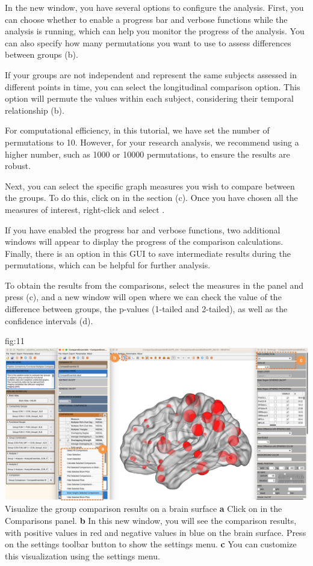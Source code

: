 \documentclass[justified]{tufte-handout}
\begin{document}
In the new window, you have several options to configure the analysis. First, you can choose whether to enable a progress bar and verbose functions while the analysis is running, which can help you monitor the progress of the analysis. You can also specify how many permutations you want to use to assess differences between groups (b).

If your groups are not independent and represent the same subjects assessed in different points in time, you can select the longitudinal comparison option. This option will permute the values within each subject, considering their temporal relationship (b).

For computational efficiency, in this tutorial, we have set the number of permutations to 10. However, for your research analysis, we recommend using a higher number, such as 1000 or 10000 permutations, to ensure the results are robust.

Next, you can select the specific graph measures you wish to compare between the groups. To do this, click on  in the  section (c). Once you have chosen all the measures of interest, right-click and select .

If you have enabled the progress bar and verbose functions, two additional windows will appear to display the progress of the comparison calculations. Finally, there is an option in this GUI to save intermediate results during the permutations, which can be helpful for further analysis.
 
To obtain the results from the comparisons, select the measures in the  panel and press  ({c}), and a new window will open where we can check the value of the difference between groups, the p-values (1-tailed and 2-tailed), as well as the confidence intervals ({d}).

	{fig:11}
	{
	\includegraphics{fig11.jpg}
	}
	{Visualize the group comparison results on a brain surface}
	{
	{\bf a} Click on  in the Comparisons panel.
	{\bf b} In this new window, you will see the comparison results, with positive values in red and negative values in blue on the brain surface. Press on the settings toolbar button to show the settings menu.
{\bf c} You can customize this visualization using the settings menu.
	}
\end{document}
